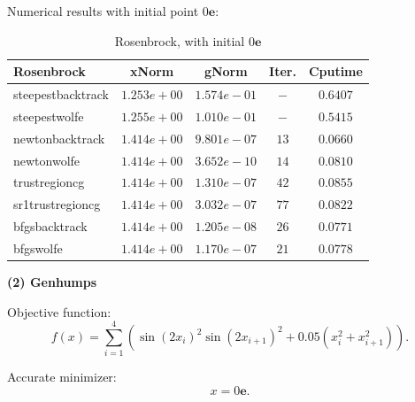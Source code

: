 \documentclass[11pt]{report}
\begin{document}
Numerical results with initial point $0\mathbf{e}$:
\begin{table}[htpb]
    \caption{Rosenbrock, with initial $0\mathbf{e}$}
    \label{tab:Rosenbrock_initial}
    \begin{center}
        \begin{tabular}{l|cccc}
\textbf{Rosenbrock}           &   \textbf{xNorm}     &\textbf{gNorm}     & \textbf{Iter.}&  \textbf{Cputime}   \\
\hline
steepestbacktrack   &   $1.253e+00 $&   $1.574e-01 $&   $- $&    $0.6407    $    \\
steepestwolfe       &   $1.255e+00 $&   $1.010e-01 $&   $- $&    $0.5415    $    \\
newtonbacktrack     &   $1.414e+00 $&   $9.801e-07 $&   $13   $&    $0.0660    $    \\
newtonwolfe         &   $1.414e+00 $&   $3.652e-10 $&   $14   $&    $0.0810    $    \\
trustregioncg       &   $1.414e+00 $&   $1.310e-07 $&   $42   $&    $0.0855    $    \\
sr1trustregioncg    &   $1.414e+00 $&   $3.032e-07 $&   $77   $&    $0.0822    $    \\
bfgsbacktrack       &   $1.414e+00 $&   $1.205e-08 $&   $26   $&    $0.0771    $    \\
bfgswolfe           &   $1.414e+00 $&   $1.170e-07 $&   $21   $&    $0.0778    $    \\     \end{tabular}
    \end{center}
\end{table}

\textbf{(2) Genhumps }

Objective function: 
\begin{equation}
    f(x) = \sum_{i=1}^4(\sin(2x_i)^2\sin(2x_{i+1})^2+0.05(x_i^2+x_{i+1}^2)).
\end{equation}

Accurate minimizer:
\begin{equation}
    x = 0\mathbf{e}  .
\end{equation}
\end{document}
